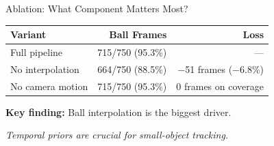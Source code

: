 \documentclass[aspectratio=169]{beamer}
\begin{document}
\begin{frame}{Ablation: What Component Matters Most?}
  \centering
  \small
  \begin{table}
    \begin{tabular}{lrr}
      \toprule
      \textbf{Variant} & \textbf{Ball Frames} & \textbf{Loss} \\
      \midrule
      Full pipeline & 715/750 (95.3\%) & — \\
      No interpolation & 664/750 (88.5\%) & −51 frames (−6.8\%) \\
      No camera motion & 715/750 (95.3\%) & 0 frames on coverage \\
      \bottomrule
    \end{tabular}
  \end{table}
  
  \vspace{0.3cm}
  \textbf{Key finding:} Ball interpolation is the biggest driver.
  
  \vspace{0.2cm}
  \textit{Temporal priors are crucial for small-object tracking.}
\end{frame}
\end{document}
